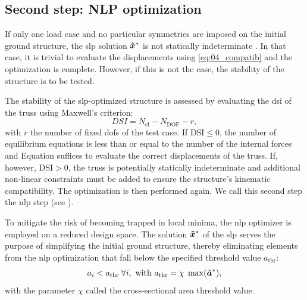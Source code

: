 \subsection{Second step: NLP optimization}
If only one load case and no particular symmetries are imposed on the initial ground structure, the \gls{slp} solution $\bm{\tilde{x}}^*$ is not statically indeterminate . In that case, it is trivial to evaluate the displacements using \eqref{eq:04_compatib} and the optimization is complete. However, if this is not the case, the stability of the structure is to be tested. 

The stability of the \gls{slp}-optimized structure is assessed by evaluating the \gls{dsi} of the truss using Maxwell's criterion:
\begin{equation}
    DSI= N_{\text{el}} - N_{\text{DOF}} - r,
\end{equation}
with $r$ the number of fixed \gls{dofs} of the test case. If $\text{DSI}\leq0$, the number of equilibrium equations is less than or equal to the number of the internal forces and Equation  suffices to evaluate the correct displacements of the truss. If, however, $\text{DSI}>0$, the truss is potentially statically indeterminate and additional non-linear constraints must be added to ensure the structure's kinematic compatibility. The optimization is then performed again. We call this second step the \gls{nlp} step (see ). 

To mitigate the risk of becoming trapped in local minima, the \gls{nlp} optimizer is employed on a reduced design space. The solution $\bm{\tilde{x}}^*$ of the \gls{slp} serves the purpose of simplifying the initial ground structure, thereby eliminating elements from the \gls{nlp} optimization that fall below the specified threshold value $a_{\text{thr}}$:
\begin{equation}
    a_i<a_{\text{thr}} \; \forall i, \text{ with }a_{\text{thr}} = \chi \; \max(\tilde{\bm{a}}^*),
    \label{eq:04_thr}
\end{equation}
with the parameter $\chi$ called the cross-sectional area threshold value.

